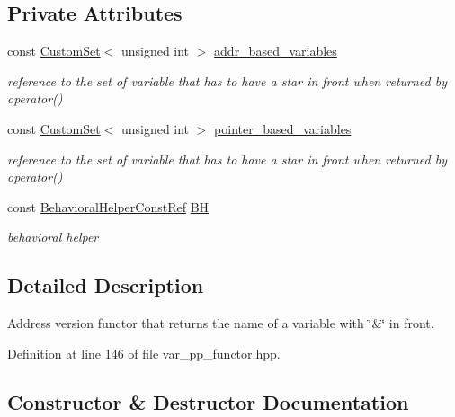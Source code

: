 \subsection*{Private Attributes}
\begin{DoxyCompactItemize}
\item 
const \hyperlink{custom__set_8hpp_a615bc2f42fc38a4bb1790d12c759e86f}{Custom\+Set}$<$ unsigned int $>$ \hyperlink{structaddress__var__pp__functor_a59937bfbf38b56b7643f2638431802ed}{addr\+\_\+based\+\_\+variables}
\begin{DoxyCompactList}\small\item\em reference to the set of variable that has to have a star in front when returned by operator() \end{DoxyCompactList}\item 
const \hyperlink{custom__set_8hpp_a615bc2f42fc38a4bb1790d12c759e86f}{Custom\+Set}$<$ unsigned int $>$ \hyperlink{structaddress__var__pp__functor_a4805a40dad12be1acf296023dd44f1c7}{pointer\+\_\+based\+\_\+variables}
\begin{DoxyCompactList}\small\item\em reference to the set of variable that has to have a star in front when returned by operator() \end{DoxyCompactList}\item 
const \hyperlink{behavioral__helper_8hpp_aae973b54cac87eef3b27442aa3e1e425}{Behavioral\+Helper\+Const\+Ref} \hyperlink{structaddress__var__pp__functor_aa7335df50eb216fe15b1f9100b2e353d}{BH}
\begin{DoxyCompactList}\small\item\em behavioral helper \end{DoxyCompactList}\end{DoxyCompactItemize}


\subsection{Detailed Description}
Address version functor that returns the name of a variable with \char`\"{}\&\char`\"{} in front. 

Definition at line 146 of file var\+\_\+pp\+\_\+functor.\+hpp.



\subsection{Constructor \& Destructor Documentation}
\mbox{\label{structaddress__var__pp__functor_ab4da8d516695d734d6853a0ec8b6af81}} 

